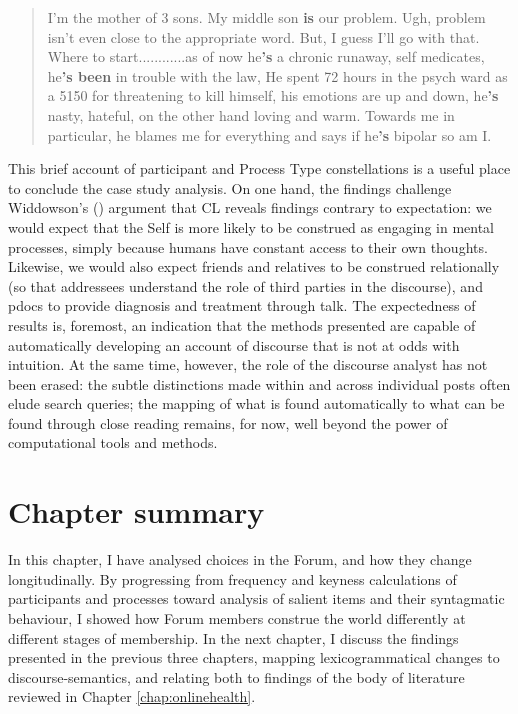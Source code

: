 \begin{quote}
\small
\singlespacing
I'm the mother of 3 sons. My middle son \textbf{is} our problem. Ugh, problem isn't even close to the appropriate word. But, I guess I'll go with that. Where to start............as of now he\textbf{'s} a chronic runaway, self medicates, he\textbf{'s been} in trouble with the law, He spent 72 hours in the psych ward as a 5150 for threatening to kill himself, his emotions are up and down, he\textbf{'s} nasty, hateful, on the other hand loving and warm. Towards me in particular, he blames me for everything and says if he\textbf{'s} bipolar so am I. 
\end{quote}
%
This brief account of participant and Process Type constellations is a useful place to conclude the case study analysis. On one hand, the findings challenge Widdowson's (\citeyear{widdowson_limitations_2000}) argument that \gls{CL} reveals findings contrary to expectation: we would expect that the Self is more likely to be construed as engaging in mental processes, simply because humans have constant access to their own thoughts. Likewise, we would also expect friends and relatives to be construed relationally (so that addressees understand the role of third parties in the discourse), and pdocs to provide diagnosis and treatment through talk. The expectedness of results is, foremost, an indication that the methods presented are capable of automatically developing an account of discourse that is not at odds with intuition. At the same time, however, the role of the discourse analyst has not been erased: the subtle distinctions made within and across individual \glspl{post} often elude search queries; the mapping of what is found automatically to what can be found through close reading remains, for now, well beyond the power of computational tools and methods.

\section{Chapter summary}

In this chapter, I have analysed  choices in the \gls{Forum}, and how they change longitudinally. By progressing from frequency and keyness calculations of participants and processes toward analysis of salient items and their syntagmatic behaviour, I showed how \gls{Forum} members construe the world differently at different stages of membership. In the next chapter, I discuss the findings presented in the previous three chapters, mapping lexicogrammatical changes to \glspl{discourse-semantic}, and relating both to findings of the body of literature reviewed in Chapter \ref{chap:onlinehealth}.

